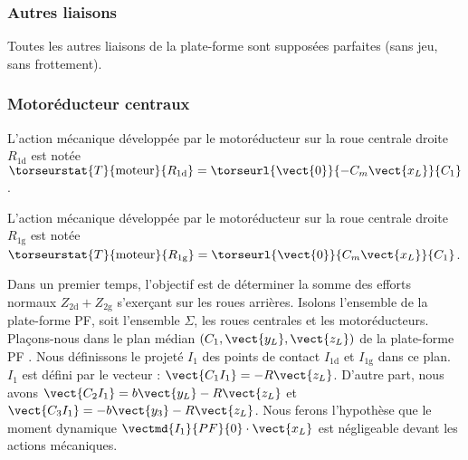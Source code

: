 \subsubsection*{Autres liaisons}

Toutes les autres liaisons de la plate-forme sont supposées parfaites (sans jeu, sans frottement).

\subsubsection*{Motoréducteur centraux}


L’action mécanique développée par le motoréducteur sur la roue centrale droite $R_{\text{1d}}$ est notée
$\torseurstat{T}{\text{moteur}}{R_{\text{\text{1d}}}}
=\torseurl{\vect{0}}{-C_m\vect{x_L}}{C_1}$.

L’action mécanique développée par le motoréducteur sur la roue centrale droite $R_{\text{1g}}$ est notée
$\torseurstat{T}{\text{moteur}}{R_{\text{\text{1g}}}}
=\torseurl{\vect{0}}{C_m\vect{x_L}}{C_1}$.


\fi


\ifprof
\begin{corrige}
\end{corrige}
\else
\fi

\ifprof
\else

Dans un premier temps, l’objectif est de déterminer la somme des efforts normaux $Z_{\text{2d}} + Z_{\text{2g}} $ s’exerçant sur les roues arrières. Isolons l’ensemble de la plate-forme PF, soit l’ensemble $\Sigma$, les roues centrales et les  motoréducteurs.
Plaçons-nous dans le plan médian $\left( C_1, \vect{y_L}, \vect{z_L}\right)$ de la plate-forme PF . Nous définissons le projeté $I_1$ des points de
contact $I_{\text{1d}}$ et $I_{\text{1g}}$ dans ce plan. $I_1$ est défini par le vecteur : $\vect{C_1I_1}=-R\vect{z_L}$. D’autre part, nous avons 
$\vect{C_2I_1}=b\vect{y_L}-R\vect{z_L}$ et $\vect{C_3I_1}=-b\vect{y_3}-R\vect{z_L}$.
Nous ferons l’hypothèse que le moment dynamique $\vectmd{I_1}{PF}{0} \cdot \vect{x_L}$
est négligeable devant les actions mécaniques.
\fi



\ifprof
\begin{corrige}
\end{corrige}
\else
\fi

